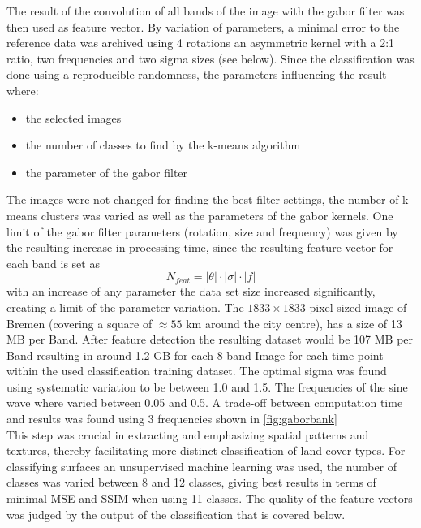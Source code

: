 \documentclass[12pt,a4paper, english,twoside]{scrartcl}
\begin{document}
 \noindent 
      The result of the convolution of all bands of the image with the gabor filter was then used as feature vector. 
      By variation of parameters, a minimal error to the reference data was archived using 4 rotations an asymmetric kernel with a 2:1 ratio, two frequencies and two sigma sizes (see below).
      Since the classification was done using a reproducible randomness, the parameters influencing the result where:
      \begin{itemize}
        \item the selected images
        \item the number of classes to find by the k-means algorithm
        \item the parameter of the gabor filter
      \end{itemize}
      The images were not changed for finding the best filter settings, the number of k-means clusters was varied as well as the parameters of the gabor kernels. 
      One limit of the gabor filter parameters (rotation, size and frequency) was given by the resulting increase in processing time, since the resulting feature vector for each band is set as      %
      \begin{equation}
        N_{feat} = |\theta| \cdot |\sigma| \cdot |f| 
      \end{equation}
      with an increase of any parameter the data set size increased significantly, creating a limit of the parameter variation. 
    The $1833 \times 1833$ pixel sized image of Bremen (covering a square of $\approx 55$ km around the city centre), has a size of 13 MB per Band. 
    After feature detection the resulting dataset would be 107 MB per Band resulting in around 1.2 GB for each 8 band Image for each time point within the used classification training dataset.
    The optimal sigma was found using systematic variation to be between 1.0 and 1.5. 
    The frequencies of the sine wave where varied between 0.05 and 0.5. 
    A trade-off between computation time and results was found using 3 frequencies shown in \cref{fig:gaborbank} \\ 
    This step was crucial in extracting and emphasizing spatial patterns and textures, thereby facilitating more distinct classification of land cover types.
      For classifying surfaces an unsupervised machine learning was used, the number of classes was varied between 8 and 12 classes, giving best results in terms of minimal \gls{MSE} and \gls{SSIM} when using 11 classes.
      The quality of the feature vectors was judged by the output of the classification that is covered below. 
\end{document}
